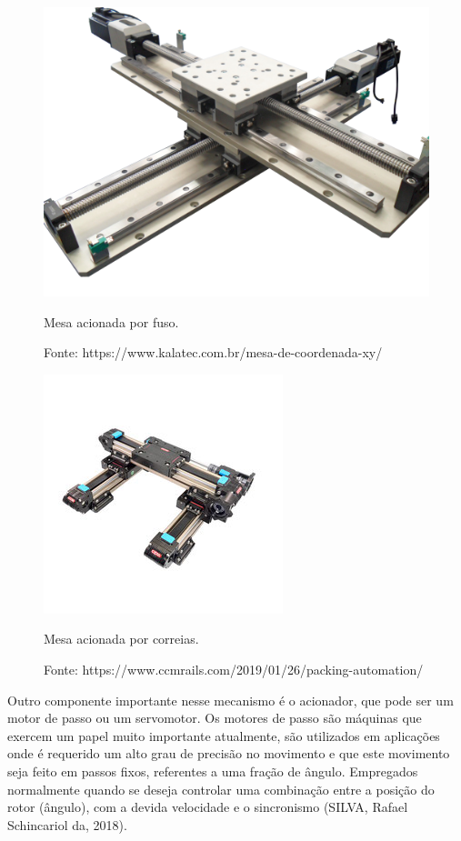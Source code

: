 \begin{figure}[!htb]
\centering
\includegraphics[scale = 0.3]{figuras/2-2}
\caption{Mesa acionada por fuso.}
\caption*{Fonte: https://www.kalatec.com.br/mesa-de-coordenada-xy/}
\label{figmfuso}
\end{figure}
    
\begin{figure}[!htb]
\centering
\includegraphics[scale = 1]{figuras/2-3}
\caption{Mesa acionada por correias.}
\caption*{Fonte: https://www.ccmrails.com/2019/01/26/packing-automation/}
\label{figmcorreia}
\end{figure}
    
Outro componente importante nesse mecanismo é o acionador, que pode ser um motor de passo ou um servomotor. 
Os motores  de passo são máquinas que exercem um papel muito importante atualmente, são utilizados em 
aplicações onde é requerido um alto grau de precisão no movimento e que este movimento seja feito em passos 
fixos, referentes a uma fração de ângulo. Empregados normalmente quando se deseja controlar uma combinação 
entre a posição do rotor (ângulo), com a devida velocidade e o sincronismo (SILVA, Rafael Schincariol da, 2018).

